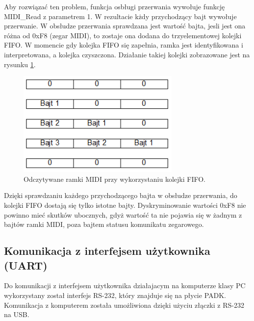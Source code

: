 Aby rozwiązać ten problem, funkcja osbługi przerwania wywołuje funkcję MIDI\_Read z parametrem 1. W rezultacie kżdy przychodzący bajt wywołuje przerwanie. W obsłudze przerwania sprawdzana jest wartość bajta, jesli jest ona różna od 0xF8 (zegar MIDI), to zostaje ona dodana do trzyelementowej kolejki FIFO. W momencie gdy kolejka FIFO się zapełnia, ramka jest identyfikowana i interpretowana, a kolejka czyszczona. Działanie takiej kolejki zobrazowane jest na rysunku \ref{rys:real_fifo}.
\begin{figure}[H]
	\centering
	\includegraphics[width=8cm]{./grafiki/real_fifo}
	\captionsetup{justification=centering}
	\caption{Odczytywane ramki MIDI przy wykorzystaniu kolejki FIFO.}
	\label{rys:real_fifo}
\end{figure} 
Dzięki sprawdzaniu każdego przychodzącego bajta w obsłudze przerwania, do kolejki FIFO dostają się tylko istotne bajty. Dyskryminowanie wartości 0xF8 nie powinno mieć skutków ubocznych, gdyż wartość ta nie pojawia się w żadnym z bajtów ramki MIDI, poza bajtem statusu komunikatu zegarowego.

\subsection{Komunikacja z interfejsem użytkownika (UART)}
Do komunikacji z interfejsem użytkownika działajacym na komputerze klasy PC wykorzystany został interfejs RS-232, który znajduje się na płycie PADK. Komunikacja z komputerem została umożliwiona dzięki użyciu złączki z RS-232 na USB.

